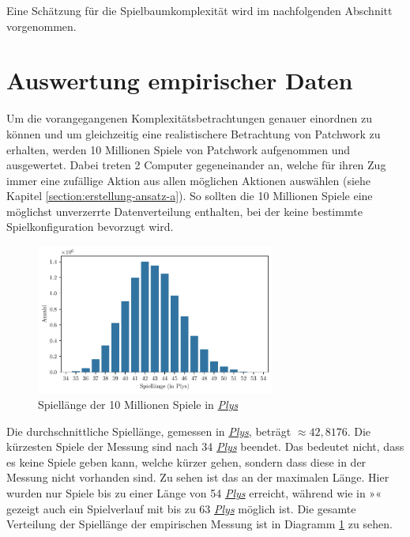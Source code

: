 Eine Schätzung für die Spielbaumkomplexität wird im nachfolgenden Abschnitt vorgenommen.

\section{Auswertung empirischer Daten}

Um die vorangegangenen Komplexitätsbetrachtungen genauer einordnen zu können und um gleichzeitig eine realistischere Betrachtung von Patchwork zu erhalten, werden 10 Millionen Spiele von Patchwork aufgenommen und ausgewertet. Dabei treten 2 Computer gegeneinander an, welche für ihren Zug immer eine zufällige Aktion aus allen möglichen Aktionen auswählen (siehe Kapitel \ref{section:erstellung-ansatz-a}). So sollten die 10 Millionen Spiele eine möglichst unverzerrte Datenverteilung enthalten, bei der keine bestimmte Spielkonfiguration bevorzugt wird.

\begin{figure}[!ht]
    \centering
    \includegraphics[width=0.7\textwidth]{res/pictures/plots/game_lengths.pdf}
    \caption{Spiellänge der 10 Millionen Spiele in \hyperref[text:ply]{\emph{Plys}}}
    \label{fig:plot-game-length-10-million}
\end{figure}

Die durchschnittliche Spiellänge, gemessen in \hyperref[text:ply]{\emph{Plys}}, beträgt ${\approx}42{,}8176$. Die kürzesten Spiele der Messung sind nach 34 \hyperref[text:ply]{\emph{Plys}} beendet. Das bedeutet nicht, dass es keine Spiele geben kann, welche kürzer gehen, sondern dass diese in der Messung nicht vorhanden sind. Zu sehen ist das an der maximalen Länge. Hier wurden nur Spiele bis zu einer Länge von 54 \hyperref[text:ply]{\emph{Plys}} erreicht, während wie in »« gezeigt auch ein Spielverlauf mit bis zu 63 \hyperref[text:ply]{\emph{Plys}} möglich ist. Die gesamte Verteilung der Spiellänge der empirischen Messung ist in Diagramm \ref{fig:plot-game-length-10-million} zu sehen.

